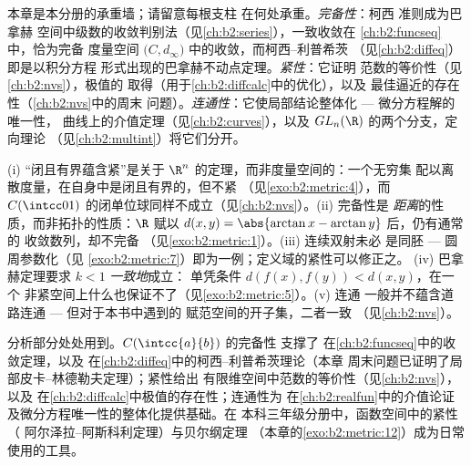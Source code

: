 \begin{remark}[本分册内的几个视角]\label{rem:b2:metric:perspectives}
本章是本分册的承重墙；请留意每根支柱
在何处承重。\emph{完备性}：柯西
准则成为巴拿赫
空间中级数的收敛判别法（见\cref{ch:b2:series}），一致收敛在
\cref{ch:b2:funcseq}中，恰为完备
度量空间 $\bigl(C, d_\infty\bigr)$ 中的收敛，而柯西--利普希茨
（见\cref{ch:b2:diffeq}）即是以积分方程
形式出现的巴拿赫不动点定理。\emph{紧性}：它证明
范数的等价性（见\cref{ch:b2:nvs}），极值的
取得（用于\cref{ch:b2:diffcalc}中的优化），以及
最佳逼近的存在性（\cref{ch:b2:nvs}中的周末
问题）。\emph{连通性}：它使局部结论整体化
--- 微分方程解的唯一性，
曲线上的介值定理（见\cref{ch:b2:curves}），以及
$GL_n(\R)$ 的两个分支，定向理论
（见\cref{ch:b2:multint}）将它们分开。
\end{remark}

\begin{remark}[常见误区]\label{rem:b2:metric:pitfalls}
(i) “闭且有界蕴含紧”是关于
$\R^n$ 的定理，而非度量空间的：一个无穷集
配以离散度量，在自身中是闭且有界的，但不紧
（见\cref{exo:b2:metric:4}），而
$C(\intcc01)$ 的闭单位球同样不成立（见\cref{ch:b2:nvs}）。(ii) 完备性是
\emph{距离}的性质，而非拓扑的性质：$\R$
赋以 $d(x,y) = \abs{\arctan x - \arctan y}$ 后，仍有通常的
收敛数列，却不完备
（见\cref{exo:b2:metric:1}）。(iii) 连续双射未必
是同胚 --- 圆周参数化（见
\cref{exo:b2:metric:7}）即为一例；定义域的紧性可以修正之。
(iv) 巴拿赫定理要求 $k < 1$ \emph{一致地}成立：
单凭条件 $d(f(x), f(y)) < d(x,y)$，在一个
非紧空间上什么也保证不了（见\cref{exo:b2:metric:5}）。(v) 连通
一般并不蕴含道路连通 --- 但对于本书中遇到的
赋范空间的开子集，二者一致
（见\cref{ch:b2:nvs}）。
\end{remark}

\begin{remark}[本章的应用]
分析部分处处用到。$C(\intcc{a}{b})$ 的完备性
支撑了
在\cref{ch:b2:funcseq}中的收敛定理，以及
在\cref{ch:b2:diffeq}中的柯西–利普希茨理论（本章
周末问题已证明了局部皮卡–林德勒夫定理）；紧性给出
有限维空间中范数的等价性（见\cref{ch:b2:nvs}），以及
在\cref{ch:b2:diffcalc}中极值的存在性；连通性为
在\cref{ch:b2:realfun}中的介值论证
及微分方程唯一性的整体化提供基础。在
本科三年级分册中，函数空间中的紧性（
阿尔泽拉–阿斯科利定理）与贝尔纲定理
（本章的\cref{exo:b2:metric:12}）成为日常使用的工具。
\end{remark}

